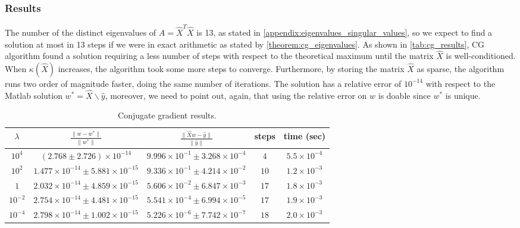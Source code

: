 \subsubsection{Results}
The number of the distinct eigenvalues of $A = \hat{X}^{T} \hat{X}$ is 13, as stated in \ref{appendix:eigenvalues_singular_values}, so we expect to find a solution at most in 13 steps if we were in exact arithmetic as stated by \autoref{theorem:cg_eigenvalues}. As shown in \autoref{tab:cg_results}, CG algorithm found a solution requiring a less number of steps with respect to the theoretical maximum until the matrix $\hat{X}$ is well-conditioned. When $\kappa(\hat{X})$ increases, the algorithm took some more steps to converge. Furthermore, by storing the matrix $\hat{X}$ as sparse, the algorithm runs two order of magnitude faster, doing the same number of iterations. The solution has a relative error of $10^{-14}$ with respect to the Matlab solution $w^* = \hat{X}\backslash \hat{y}$, moreover, we need to point out, again, that using the relative error on $w$ is doable since $w^*$ is unique.
\begin{table}[H]
\centering
\begin{tabular}{c|c|c|c|c} \hline \hline
    $\lambda$&$\frac{\lVert w - w^{*} \lVert}{\rVert w^{*} \lVert}$ & $\frac{\lVert \hat{X}w - \hat{y} \lVert }{\lVert \hat{y} \lVert}$ & steps & time (sec)\\ \hline \hline
    
    \rowcolor{gray!30} $10^4$ & $(2.768 \pm 2.726)\times 10^{-14}$ & $ 9.996 \times 10^{-1} \pm 3.268 \times 10^{-4}$ & $4$& $5.5 \times 10^{-4}$\\
    
    $10^2$ & $ 1.477 \times 10^{-14} \pm 5.881 \times 10^{-15}$ & $ 9.336 \times 10^{-1} \pm 4.214 \times 10^{-2}$ & $10$& $1.2 \times 10^{-3}$\\
    
    \rowcolor{gray!30} $1$ & $2.032\times 10^{-14} \pm 4.859 \times 10^{-15} $ & $ 5.606 \times 10^{-2} \pm 6.847 \times 10^{-3} $ & $17$& $1.8 \times 10^{-3}$\\
    
    $10^{-2}$ & $2.754 \times 10^{-14} \pm 4.481 \times 10^{-15}$ & $5.541 \times 10^{-4} \pm 6.994 \times 10^{-5}$ & $17$& $1.9 \times 10^{-3}$\\
    
    \rowcolor{gray!30} $10^{-4}$ & $2.798 \times 10^{-14} \pm 1.002 \times 10^{-15}$ & $5.226 \times 10^{-6} \pm 7.742 \times 10^{-7}$ & $18$ & $2.0 \times 10^{-3}$ \\
    \hline \hline
\end{tabular}
\caption{Conjugate gradient results.}
\label{tab:cg_results}
\end{table}

